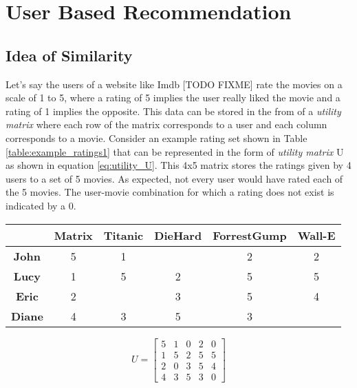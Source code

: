 
\section{User Based Recommendation}
\subsection{Idea of Similarity}
Let's say the users of a website like Imdb [TODO FIXME] rate the movies on a scale of 1 to 5, where a rating of 5 implies the user really liked the movie and a rating of 1 implies the opposite. This data can be stored in the from of a \textit{utility matrix} where each row of the matrix corresponds to a user and each column corresponds to a movie. Consider an example rating set shown in Table \ref{table:example_ratings1} that can be represented in the form of \textit{utility matrix} U as shown in equation \ref{eq:utility_U}. This 4x5 matrix stores the ratings given by 4 users to a set of 5 movies. As expected, not every user would have rated each of the 5 movies. The user-movie combination for which a rating does not exist is indicated by a 0.
\begin{table*}
\centering
\begin{tabular}{|c|c|c|c|c|c|}
\hline
\textbf{} 			& \textbf{Matrix} & \textbf{Titanic} & \textbf{DieHard} & \textbf{ForrestGump} & \textbf{Wall-E}\\ 
\hline
\textbf{John} 		& 	 	5		  & 		1		 & 				    &   	2			   & 		2		\\ 
\hline
\textbf{Lucy} 		& 	 	1		  & 		5		 & 		2		    &   	5			   & 		5		\\ 
\hline
\textbf{Eric} 		& 	 	2		  & 				 & 		3		    &   	5			   & 		4		\\ 
\hline
\textbf{Diane} 		& 	 	4		  & 		3		 & 		5		    &   	3			   & 				\\ 
\hline
\end{tabular}
\caption{Example ratings}
\label{table:example_ratings1}
\end{table*}

\begin{equation} \label{eq:utility_U}
U = 
	\left[
	\begin{matrix} %
	5 & 1 & 0 & 2 & 0\\
	1 & 5 & 2 & 5 & 5\\
	2 & 0 & 3 & 5 & 4\\
	4 & 3 & 5 & 3 & 0
	\end{matrix}
	\right]
	\end{equation}
	
